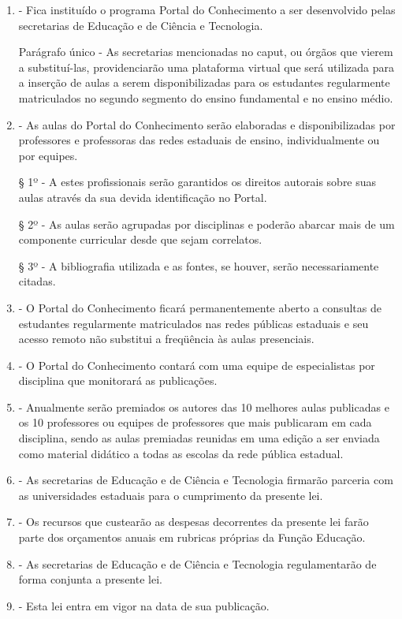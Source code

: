 \documentclass[10pt]{article}
\begin{document}
\begin{enumerate}[label=Art. \arabic*\textdegree]
\item - Fica instituído o programa Portal do Conhecimento a ser desenvolvido pelas  secretarias de Educação e de Ciência e Tecnologia.

Parágrafo único - As secretarias mencionadas no caput, ou órgãos que vierem a substituí-las, providenciarão uma plataforma virtual que será utilizada para a inserção de aulas a serem disponibilizadas para os estudantes regularmente matriculados no segundo segmento do ensino fundamental e no ensino médio.

\item - As aulas do Portal do Conhecimento serão elaboradas e disponibilizadas por professores e professoras das redes estaduais de ensino, individualmente ou por equipes.

§ 1º - A estes profissionais serão garantidos os direitos autorais sobre suas aulas através da sua devida identificação no Portal.

§ 2º - As aulas serão agrupadas por disciplinas e poderão abarcar mais de um componente curricular desde que sejam correlatos.  

§ 3º - A bibliografia utilizada e as fontes, se houver, serão necessariamente citadas.

\item - O Portal do Conhecimento ficará permanentemente aberto a consultas de estudantes regularmente matriculados nas redes públicas estaduais e seu acesso remoto não substitui a freqüência às aulas presenciais.

\item - O Portal do Conhecimento contará com uma equipe de especialistas por disciplina que monitorará as publicações.

\item - Anualmente serão premiados os autores das 10 melhores aulas publicadas e os 10 professores ou equipes de professores que mais publicaram em cada disciplina, sendo as aulas premiadas reunidas em uma edição a ser enviada como material didático a todas as escolas da rede pública estadual.
\item - As secretarias de Educação e de Ciência e Tecnologia firmarão parceria com as universidades estaduais para o cumprimento da presente lei.

\item - Os recursos que custearão as despesas decorrentes da presente lei farão parte dos orçamentos anuais em rubricas próprias da Função Educação.

\item - As secretarias de Educação e de Ciência e Tecnologia regulamentarão de forma conjunta a presente lei.

\item - Esta lei entra em vigor na data de sua publicação.   

\end{enumerate}
\end{document}

